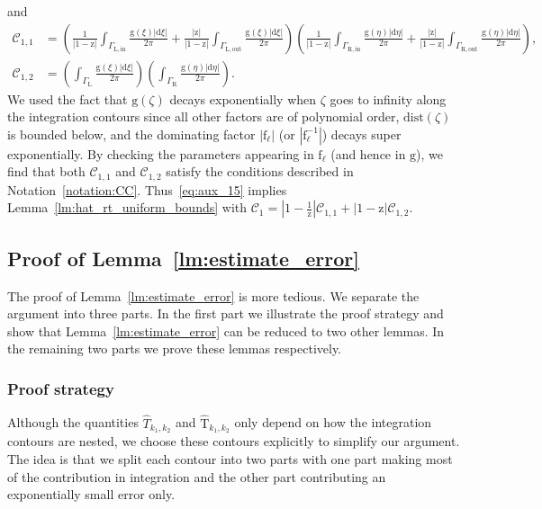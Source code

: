 \documentclass{article}
\numberwithin{equation}{section}
\newcommand{\CC}{\mathcal{C}}
\newcommand{\dg}{\mathrm{dist}}
\newcommand{\inn}{\mathrm{in}}
\newcommand{\LL}{\mathrm{L}}
\newcommand{\out}{\mathrm{out}}
\newcommand{\rg}{\mathrm{g}}
\newcommand{\RR}{\mathrm{R}}
\begin{document}
and
\begin{equation*}
	\begin{split}
		\CC_{1,1}&=\left(  \frac{1}{|1-\mathrm{z}|} \int_{\Gamma_{\LL,\inn}} 	    
		\frac{\rg(\xi)|\mathrm{d} \xi|}{2\pi}   
		+\frac{\mathrm{|z|}}{|1-\mathrm{z}|} \int_{\Gamma_{\LL,\out}} \frac{\rg(\xi)|\mathrm{d} \xi|}{2\pi}   
		\right)\left(  \frac{1}{|1-\mathrm{z}|} \int_{\Gamma_{\RR,\inn}} 	    
		\frac{\rg(\eta)|\mathrm{d} \eta|}{2\pi}   
		+\frac{\mathrm{|z|}}{|1-\mathrm{z}|} \int_{\Gamma_{\RR,\out}} \frac{\rg(\eta)|\mathrm{d} \eta|}{2\pi}   
		\right),\\
		\CC_{1,2}&=\left(  \int_{\Gamma_{\LL}} 	    
		\frac{\rg(\xi)|\mathrm{d} \xi|}{2\pi}   	  
		\right)\left(\int_{\Gamma_{\RR}} 	    
		\frac{\rg(\eta)|\mathrm{d} \eta|}{2\pi}  
		\right).
	\end{split}
\end{equation*}
We used the fact that $\rg(\zeta)$ decays exponentially when $\zeta$ goes to infinity along the integration contours since all other factors are of polynomial order, $\dg(\zeta)$ is bounded below, and the dominating factor $|\mathrm{f}_\ell|$ (or $|\mathrm{f}_\ell^{-1}|$) decays super exponentially. By checking the parameters appearing in $\mathrm{f}_\ell$ (and hence in $\rg$), we find that both $\CC_{1,1}$ and $\CC_{1,2}$ satisfy the conditions described in Notation~\ref{notation:CC}. Thus~\eqref{eq:aux_15} implies Lemma~\ref{lm:hat_rt_uniform_bounds} with $\CC_1=\left|1-\frac{1}{\mathrm{z}}\right|\CC_{1,1}+\left|1-\mathrm{z}\right|\CC_{1,2}$.


\subsection{Proof of Lemma~\ref{lm:estimate_error}}
\label{sec:proof_lm_error}

The proof of Lemma~\ref{lm:estimate_error} is more tedious. We separate the argument into three parts. In the first part we illustrate the proof strategy and show that Lemma~\ref{lm:estimate_error} can be reduced to two other lemmas. In the remaining two parts we prove these lemmas respectively.


\subsubsection{Proof strategy}
\label{sec:asymptotics_strategy}


Although the quantities $\hat T_{k_1,k_2}$ and $\mathrm{\hat T}_{k_1,k_2}$ only depend on how the integration contours are nested, we choose these contours explicitly to simplify our argument. The idea is that we split each contour into two parts with one part making most of the contribution in integration and the other part contributing an exponentially small error only.
\end{document}
